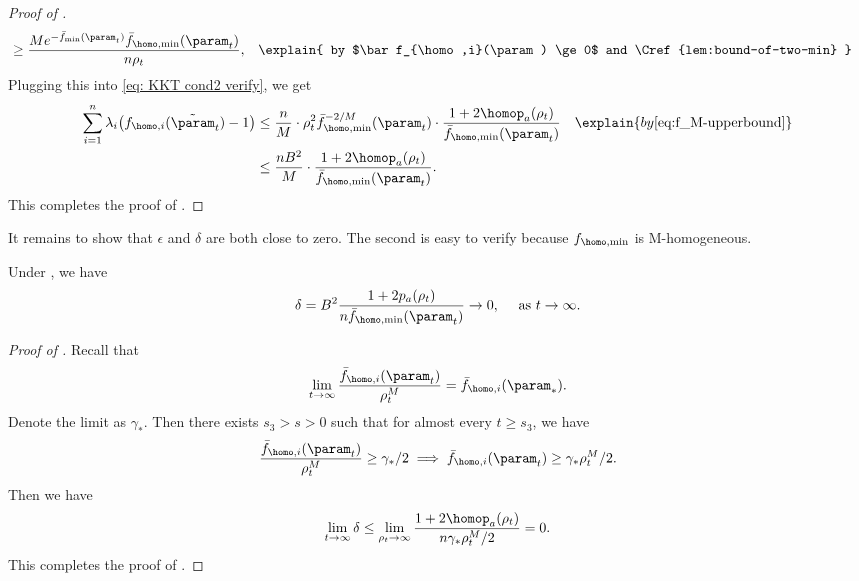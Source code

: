 \begin{proof}[Proof of ]
\begin{align*}
&\ge  \frac{M e^{-\bar f_{\min}(\param_t)} \bar f_{\homo,\min }(\param_t) }{n \rho_t}, &&\explain{ by $\bar f_{\homo,i}(\param) \ge 0$ and \Cref{lem:bound-of-two-min} } 
\end{align*}
Plugging this into \eqref{eq: KKT cond2 verify}, we get 
\begin{align*}
\sum_{i=1}^n \lambda_i \big( f_{\homo,i}(\tilde \param_t) -1 \big)  
&\le \frac{n}{M}\cdot \rho_t^2 \bar f_{\homo,\min}^{-2 /M}(\param_t)\cdot \frac{ 1+ 2\homop_a(\rho_t) }{ \bar f_{\homo,\min }(\param_t)} 
&&\explain{ by \Cref{eq:f_M-upperbound} } \\ 
&\le \frac{nB^2}{M} \cdot  \frac{1+ 2 \homop_a(\rho_t)}{ \bar f_{\homo,\min }(\param_t)}. 
\end{align*}
This completes the proof of .
\end{proof}

It remains to show that $\epsilon$ and $\delta$ are both close to zero.
The second is easy to verify because $f_{\homo,\min}$ is M-homogeneous.   

\begin{lemma}
\label{lem: q goes to 0}
Under , we have  
\[
    \delta =B^2 \frac{1+2p_a(\rho_t)}{n \bar f_{\homo,\min }(\param_t)} \to 0, \quad \text{ as } t \to \infty. 
\]
\end{lemma}
\begin{proof}[Proof of ]
Recall that 
\[
    \lim_{t\to \infty} \frac{\bar f_{\homo,i}(\param_t)}{\rho_t^M} = \bar f_{\homo,i}(\param_*).
\]
Denote the limit as $\gamma_*$. Then there exists $s_3 >s>0$ such that for almost every $t\ge s_3$, we have 
\[
     \frac{\bar f_{\homo,i}(\param_t)}{\rho_t^M} \ge \gamma_*/2 \implies \bar f_{\homo,i}(\param_t) \ge \gamma_* \rho_t^M/2.
\]
Then we have 
\[
    \lim_{t\to \infty}\delta \le \lim_{\rho_t \to \infty} \frac{1+ 2\homop_a(\rho_t)}{ n \gamma_* \rho_t^M/2} = 0. 
\]
This completes the proof of .
\end{proof}

